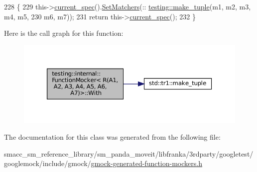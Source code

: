 \begin{DoxyCode}
228                                                     \{
229     this->\hyperlink{classtesting_1_1internal_1_1FunctionMockerBase_a744318106e20b346f4f1efbf5a601644}{current\_spec}().\hyperlink{classtesting_1_1internal_1_1MockSpec_a6b4fd303136c6282b19ddb16100f02a2}{SetMatchers}(::
      \hyperlink{namespacestd_1_1tr1_af7e12a0f5b5791b5b7c49a5a17b85359}{testing::make\_tuple}(m1, m2, m3, m4, m5,
230         m6, m7));
231     \textcolor{keywordflow}{return} this->\hyperlink{classtesting_1_1internal_1_1FunctionMockerBase_a744318106e20b346f4f1efbf5a601644}{current\_spec}();
232   \}
\end{DoxyCode}
Here is the call graph for this function\+:
\nopagebreak
\begin{figure}[H]
\begin{center}
\leavevmode
\includegraphics[width=350pt]{classtesting_1_1internal_1_1FunctionMocker_3_01R_07A1_00_01A2_00_01A3_00_01A4_00_01A5_00_01A6_00_01A7_08_4_abaa600e7ae355a1579d1c02a4ea726fb_cgraph}
\end{center}
\end{figure}


The documentation for this class was generated from the following file\+:\begin{DoxyCompactItemize}
\item 
smacc\+\_\+sm\+\_\+reference\+\_\+library/sm\+\_\+panda\+\_\+moveit/libfranka/3rdparty/googletest/googlemock/include/gmock/\hyperlink{gmock-generated-function-mockers_8h}{gmock-\/generated-\/function-\/mockers.\+h}\end{DoxyCompactItemize}
